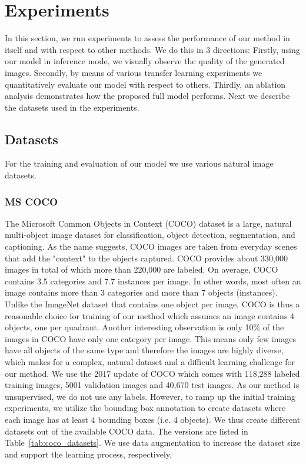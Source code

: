 \documentclass[a4paper,12pt]{report}
\begin{document}
\chapter{Experiments}\label{sec:experiments}
In this section, we run experiments to assess the performance of our method in itself and with respect to other methods. We do this in 3 directions: Firstly, using our model in inference mode, we visually observe the quality of the generated images. Secondly, by means of various transfer learning experiments we quantitatively evaluate our model with respect to others. Thirdly, an ablation analysis demonstrates how the proposed full model performs. Next we describe the datasets used in the experiments.

\section{Datasets}
For the training and evaluation of our model we use various natural image datasets.

\subsection{MS COCO}
The Microsoft Common Objects in Context (COCO) dataset \cite{MsCoco} is a large, natural multi-object image dataset for classification, object detection, segmentation, and captioning.
As the name suggests, COCO images are taken from everyday scenes that add the "context" to the objects captured. COCO provides about 330,000 images in total of which more than 220,000 are labeled. On average, COCO contains 3.5 categories and 7.7 instances per image. In other words, most often an image contains more than 3 categories and more than 7 objects (instances). Unlike the ImageNet dataset that contains one object per image, COCO is thus a reasonable choice for training of our method which assumes an image contains 4 objects, one per quadrant. Another interesting observation is only 10\% of the images in COCO have only one category per image. This means only few images have all objects of the same type and therefore the images are highly diverse, which makes for a complex, natural dataset and a difficult learning challenge for our method. We use the 2017 update of COCO which comes with 118,288 labeled training images, 5001 validation images and 40,670 test images. As our method is unsupervised, we do not use any labels. However, to ramp up the initial training experiments, we utilize the bounding box annotation to create datasets where each image has at least 4 bounding boxes (i.e. 4 objects). We thus create different datasets out of the available COCO data. The versions are listed in Table~\ref{tab:coco_datasets}. We use data augmentation to increase the dataset size and support the learning process, respectively.
\end{document}
